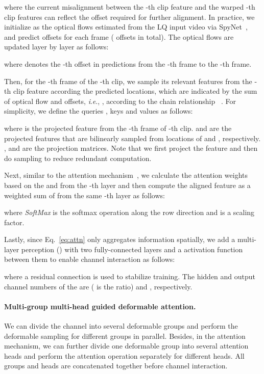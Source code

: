 \documentclass{article}
\newcommand{\ie}{\textit{i}.\textit{e}.}
\newlength \g
\begin{document}
where the current misalignment between the -th clip feature and the warped -th clip features can reflect the offset required for further alignment. In practice, we initialize  as the optical flows estimated from the LQ input video via SpyNet~\cite{ranjan2017spynet}, and predict  offsets for each frame ( offsets in total). The optical flows are updated layer by layer as follows:

where  denotes the -th offset in  predictions from the -th frame to the -th frame.

Then, for the -th frame of the -th clip, we sample its relevant features from the -th clip feature  according the predicted locations, which are indicated by the sum of optical flow and offsets, \ie, , according to the chain relationship ~\cite{chan2021basicvsr++, ranjan2017spynet}. For simplicity, we define the queries , keys  and values  as follows:

where  is the projected feature from the -th frame of -th clip.  and  are the projected features that are bilinearly sampled from  locations of  and , respectively. ,  and  are the projection matrices. Note that we first project the feature and then do sampling to reduce redundant computation.

Next, similar to the attention mechanism~\cite{vaswani2017transformer}, we calculate the attention weights based on the  and  from the -th layer and then compute the aligned feature  as a weighted sum of  from the same -th layer as follows: 

where \textit{SoftMax} is the softmax operation along the row direction and  is a scaling factor.

Lastly, since Eq.~\eqref{eq:attn} only aggregates information spatially, we add a multi-layer perception () with two fully-connected layers and a  activation function between them to enable channel interaction as follows:

where a residual connection is used to stabilize training. The hidden and output channel numbers of the  are  ( is the ratio) and , respectively. 

\vspace{-0.3cm}
\paragraph{Multi-group multi-head guided deformable attention.}
We can divide the channel into several deformable groups and perform the deformable sampling for different groups in parallel. Besides, in the attention mechanism, we can further divide one deformable group into several attention heads and perform the attention operation separately for different heads. All groups and heads are concatenated together before channel interaction. 
\end{document}
